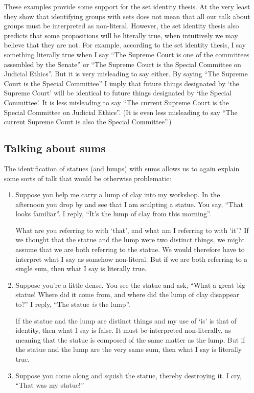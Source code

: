 \documentclass[11pt]{article}
\begin{document}
\begin{spacing}{1.5}
These examples provide some support for the set identity thesis.  At
the very least they show that identifying groups with sets does not
mean that all our talk about groups must be interpreted as
non-literal.  However, the set identity thesis also predicts that some
propositions will be literally true, when intuitively we may believe
that they are not.  For example, according to the set identity thesis,
I say something literally true when I say ``The Supreme Court is one
of the committees assembled by the Senate'' or ``The Supreme Court is
the Special Committee on Judicial Ethics''.  But it is very misleading
to say either.  By saying ``The Supreme Court is the Special
Committee'' I imply that future things designated by `the Supreme
Court' will be identical to future things designated by `the Special
Committee'.  It is less misleading to say ``The current Supreme Court
is the Special Committee on Judicial Ethics''.  (It is even less
misleading to say ``The current Supreme Court is also the Special
Committee''.)

\subsection{Talking about sums}
\label{sums-talk}
The identification of statues (and lumps) with sums allows us to again
explain some sorts of talk that would be otherwise problematic:

\begin{enumerate}
  \item Suppose you help me carry a lump of clay into my workshop.  In
    the afternoon you drop by and see that I am sculpting a statue.
    You say, ``That looks familiar''.  I reply, ``It's the lump of
    clay from this morning''.

    What are you referring to with `that', and what am I referring to
    with `it'?  If we thought that the statue and the lump were two
    distinct things, we might assume that we are both referring to the
    statue.  We would therefore have to interpret what I say as
    somehow non-literal.  But if we are both referring to a single
    sum, then what I say is literally true.

  \item Suppose you're a little dense.  You see the statue and ask,
    ``What a great big statue!  Where did it come from, and where did
    the lump of clay disappear to?''  I reply, ``The statue {\em is}
    the lump''.

    If the statue and the lump are distinct things and my use of `is'
    is that of identity, then what I say is false.  It must be
    interpreted non-literally, as meaning that the statue is composed
    of the same matter as the lump.  But if the statue and the lump
    are the very same sum, then what I say is literally true.
  \item Suppose you come along and squish the statue, thereby
    destroying it.  I cry, ``That was my statue!''


\end{enumerate}
\end{spacing}
\end{document}
